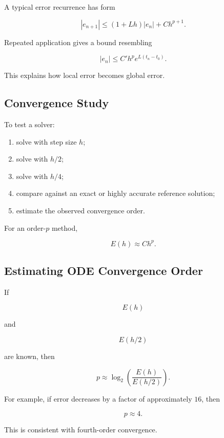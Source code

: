 A typical error recurrence has form

\[
\boxed{
|e_{n+1}|
\leq
(1+Lh)|e_n|
+
C h^{p+1}.
}
\]

Repeated application gives a bound resembling

\[
\boxed{
|e_n|
\leq
C'
h^p
e^{L(t_n-t_0)}.
}
\]

This explains how local error becomes global error.

\subsection{Convergence Study}
\label{subsec:ode-convergence-study}

To test a solver:

\begin{enumerate}
    \item solve with step size \(h\);
    \item solve with \(h/2\);
    \item solve with \(h/4\);
    \item compare against an exact or highly accurate reference solution;
    \item estimate the observed convergence order.
\end{enumerate}

For an order-\(p\) method,

\[
\boxed{
E(h)
\approx
C h^p.
}
\]

\subsection{Estimating ODE Convergence Order}
\label{subsec:estimating-ode-order}

If

\[
E(h)
\]

and

\[
E(h/2)
\]

are known, then

\[
\boxed{
p
\approx
\log_2
\left(
\frac{
E(h)
}{
E(h/2)
}
\right).
}
\]

For example, if error decreases by a factor of approximately \(16\), then

\[
\boxed{
p\approx4.
}
\]

This is consistent with fourth-order convergence.

